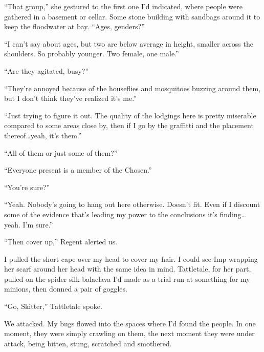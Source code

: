 ``That group,'' she gestured to the first one I'd indicated, where people were gathered in a basement or cellar.  Some stone building with sandbags around it to keep the floodwater at bay.  ``Ages, genders?''



``I can't say about ages, but two are below average in height, smaller across the shoulders.  So probably younger.  Two female, one male.''



``Are they agitated, busy?''



``They're annoyed because of the houseflies and mosquitoes buzzing around them, but I don't think they've realized it's me.''



``Just trying to figure it out.  The quality of the lodgings here is pretty miserable compared to some areas close by, then if I go by the graffitti and the placement thereof\ldots yeah, it's them.''



``All of them or just some of them?''



``Everyone present is a member of the Chosen.''



``You're sure?''



``Yeah.  Nobody's going to hang out here otherwise.  Doesn't fit.  Even if I discount some of the evidence that's leading my power to the conclusions it's finding\ldots yeah.  I'm sure.''



``Then cover up,'' Regent alerted us.



I pulled the short cape over my head to cover my hair.  I could see Imp wrapping her scarf around her head with the same idea in mind.  Tattletale, for her part, pulled on the spider silk balaclava I'd made as a trial run at something for my minions, then donned a pair of goggles.



``Go, Skitter,'' Tattletale spoke.



We attacked.  My bugs flowed into the spaces where I'd found the people.  In one moment, they were simply crawling on them, the next moment they were under attack, being bitten, stung, scratched and smothered.



